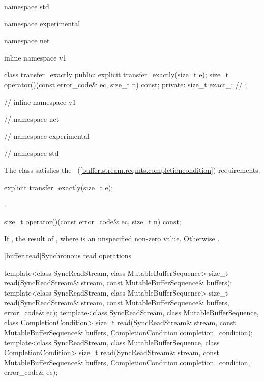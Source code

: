 \begin{codeblock}
namespace std {
namespace experimental {
namespace net {
inline namespace v1 {

  class transfer_exactly
  {
  public:
    explicit transfer_exactly(size_t e);
    size_t operator()(const error_code& ec, size_t n) const;
  private:
    size_t exact_; // \expos
  };

} // inline namespace v1
} // namespace net
} // namespace experimental
} // namespace std
\end{codeblock}

\pnum
The class  satisfies the ~(\ref{buffer.stream.reqmts.completioncondition}) requirements.

\begin{itemdecl}
explicit transfer_exactly(size_t e);
\end{itemdecl}

\begin{itemdescr}
\pnum
\postconditions {}.
\end{itemdescr}

\begin{itemdecl}
size_t operator()(const error_code& ec, size_t n) const;
\end{itemdecl}

\begin{itemdescr}
\pnum
\returns If , the result of , where  is an unspecified non-zero value. Otherwise .
\end{itemdescr}



[buffer.read]{Synchronous read operations}

%
\begin{itemdecl}
template<class SyncReadStream, class MutableBufferSequence>
  size_t read(SyncReadStream& stream,
              const MutableBufferSequence& buffers);
template<class SyncReadStream, class MutableBufferSequence>
  size_t read(SyncReadStream& stream,
              const MutableBufferSequence& buffers, error_code& ec);
template<class SyncReadStream, class MutableBufferSequence,
  class CompletionCondition>
    size_t read(SyncReadStream& stream,
                const MutableBufferSequence& buffers,
                CompletionCondition completion_condition);
template<class SyncReadStream, class MutableBufferSequence,
  class CompletionCondition>
    size_t read(SyncReadStream& stream,
                const MutableBufferSequence& buffers,
                CompletionCondition completion_condition,
                error_code& ec);
\end{itemdecl}

